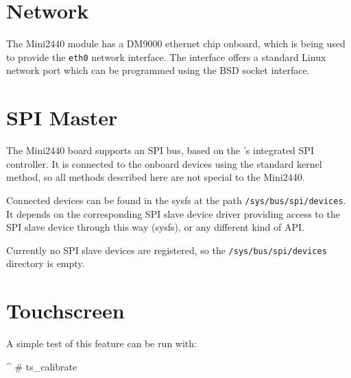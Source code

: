 
\newcommand{\perNetworkChip}{ DM9000}
\newcommand{\perNetworkInterface}{eth0}

\section{Network}				\label{sec:NET}

The Mini2440 module has a\perNetworkChip{} ethernet chip onboard,
which is being used to provide the \texttt{\perNetworkInterface{}} network
interface. The interface offers a standard Linux network port which can be
programmed using the BSD socket interface.


\section{SPI Master}				\label{sec:SPI}

The Mini2440 board supports an SPI bus, based on the \perCpuName 's
integrated SPI controller. It is connected to the onboard devices using the
standard kernel method, so all methods described here are not special to the
Mini2440.

Connected devices can be found in the sysfs at the path
\texttt{/sys/bus/spi/devices}. It depends on the corresponding SPI slave device
driver providing access to the SPI slave device through this way (sysfs),
or any different kind of API.

\begin{important}
Currently no SPI slave devices are registered, so the
\texttt{/sys/bus/spi/devices} directory is empty.
\end{important}

%
%


\section{Touchscreen}					\label{sec:TOUCH}

A simple test of this feature can be run with:

\begin{ptxshell}[escapechar=|]{^}
# ts_calibrate
\end{ptxshell}

